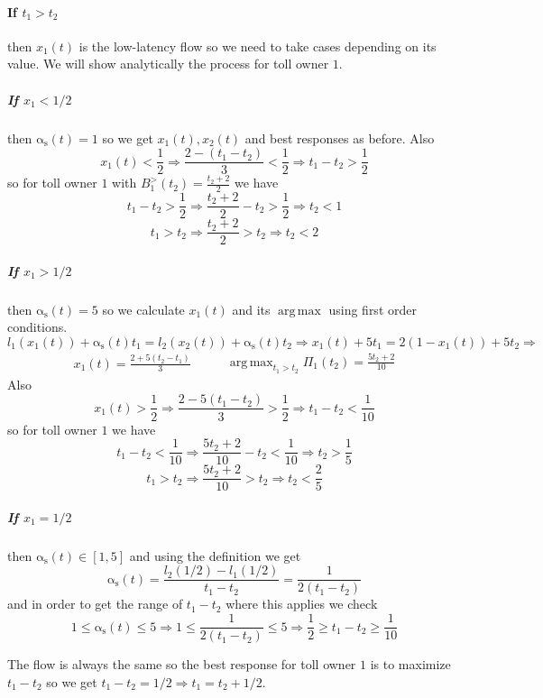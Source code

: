 \documentclass[a4paper,11pt]{article}
\newcommand{\as}{\mathrm{\alpha_s}}
\DeclareMathOperator*{\argmax}{arg\,max}
\begin{document}
\paragraph{If $t_1 > t_2$} then $x_1(t)$ is the low-latency flow so we need to take cases depending on its value.
We will show analytically the process for toll owner $1$.

\subparagraph{If $x_1 < 1/2$} then $\as(t) = 1$ so we get $x_1(t), x_2(t)$ and best responses as before.
Also
\[x_1(t) < \frac12 \Rightarrow \frac{2 - (t_1 - t_2)}{3} < \frac12 \Rightarrow t_1 - t_2 > \frac12\]
so for toll owner $1$ with $B_1^>(t_2) = \frac{t_2 + 2}2$ we have
\[t_1 - t_2 > \frac12 \Rightarrow \frac{t_2 + 2}2 - t_2 > \frac12 \Rightarrow t_2 < 1\]
\[t_1 > t_2 \Rightarrow \frac{t_2 + 2}2 > t_2 \Rightarrow t_2 < 2\]

\subparagraph{If $x_1 > 1/2$} then $\as(t) = 5$ so we calculate $x_1(t)$ and its $\argmax$ using first order conditions.
\[
	l_1(x_1(t)) + \as(t) t_1 = l_2(x_2(t)) + \as(t) t_2 \Rightarrow	x_1(t) + 5 t_1 = 2 (1 - x_1(t)) + 5 t_2 \Rightarrow
\]
\begin{equation*}
	\begin{aligned}
		x_1(t) = \frac{2 + 5 (t_2 - t_1)}3
	\end{aligned}
	\qquad
	\begin{aligned}
		\argmax_{t_1 > t_2}\Pi_1(t_2) = \frac{5 t_2 + 2}{10}
	\end{aligned}
\end{equation*}
Also
\[x_1(t) > \frac12 \Rightarrow \frac{2 - 5 (t_1 - t_2)}{3} > \frac12 \Rightarrow t_1 - t_2 < \frac1{10}\]
so for toll owner $1$ we have
\[t_1 - t_2 < \frac1{10} \Rightarrow \frac{5 t_2 + 2}{10} - t_2 < \frac1{10} \Rightarrow t_2 > \frac15\]
\[t_1 > t_2 \Rightarrow \frac{5 t_2 + 2}{10} > t_2 \Rightarrow t_2 < \frac25\]

\subparagraph{If $x_1 = 1/2$} then $\as(t) \in [1, 5]$ and using the definition we get
\[\as(t) = \frac{l_2(1/2) - l_1(1/2)}{t_1 - t_2} = \frac1{2 (t_1 - t_2)}\]
and in order to get the range of $t_1 - t_2$ where this applies we check
\[1 \le \as(t) \le 5 \Rightarrow 1 \le \frac1{2 (t_1 - t_2)} \le 5 \Rightarrow \frac12 \ge t_1 - t_2 \ge \frac1{10}\]

The flow is always the same so the best response for toll owner $1$ is to maximize $t_1 - t_2$ so we get $t_1 - t_2 = 1/2 \Rightarrow t_1 = t_2 + 1/2$.
\end{document}

